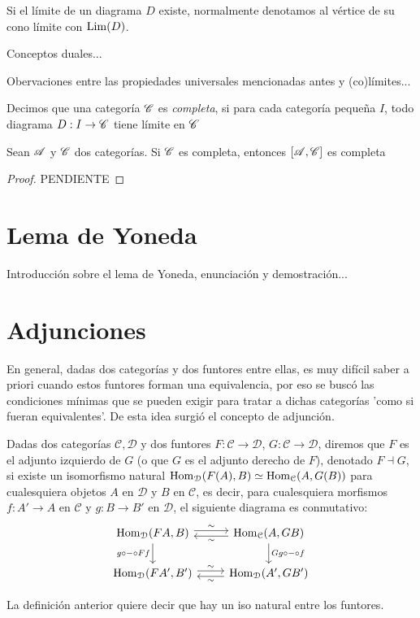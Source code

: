 \documentclass{comunicaciones}
\begin{document}
Si el límite de un diagrama $D$ existe, normalmente denotamos al vértice de su cono límite con $\mathrm{Lim}(D)$.

Conceptos duales...

Obervaciones entre las propiedades universales mencionadas antes y (co)límites...

\begin{dfn}
    Decimos que una categoría $\mathscr C$ es \emph{completa}, si para cada categoría pequeña $I$, todo diagrama $D:I\to\mathscr C$ tiene límite en $\mathscr C$
\end{dfn}


\begin{thm}
    Sean $\mathscr A$ y $\mathscr C$ dos categorías. Si $\mathscr C$ es completa, entonces $[\mathscr A,\mathscr C]$ es completa
\end{thm}
\begin{proof}
    PENDIENTE
\end{proof}

\section{Lema de Yoneda}

Introducción sobre el lema de Yoneda, enunciación y demostración...

\section{Adjunciones}

En general, dadas dos categorías y dos funtores entre ellas, es muy difícil saber a priori cuando estos funtores forman una equivalencia, por eso se buscó las condiciones mínimas que se pueden exigir para tratar a dichas categorías 'como si fueran equivalentes'. De esta idea surgió el concepto de adjunción.
\begin{dfn}
	Dadas dos categorías $\mathcal{C,D}$ y dos funtores $F:\mathcal{C\to D}$, $G:\mathcal{C\to D}$, diremos que $F$ es el adjunto izquierdo de $G$ (o que $G$ es el adjunto derecho de $F$), denotado $F\dashv G$, si existe un isomorfismo natural $\mathrm{Hom}_\mathcal{D}(F(A),B)\simeq \mathrm{Hom}_\mathcal{C}(A,G(B))$ para cualesquiera objetos $A$ en $\mathcal{D}$ y $B$ en $\mathcal{C}$, es decir, para cualesquiera morfismos $f:A'\to A$
	en $\mathcal C$ y $g:B\to B'$ en $\mathcal D$,
	el siguiente diagrama es conmutativo:
	\[
	\begin{tikzcd}
		\Hom_\mathcal{D}(FA,B)
		\ar[d,"g\circ-\circ Ff"']
		\ar[r,"\sim",shift left]
		& \Hom_\mathcal{C}(A,GB) 
		\ar[d,"Gg\circ-\circ f"]
		\ar[l,"\sim",shift left] \\
		\Hom_\mathcal{D}(FA',B')
		\ar[r,"\sim",shift left]
		& \Hom_\mathcal{D}(A',GB')
		\ar[l,"\sim",shift left]
	\end{tikzcd}
	\]
\end{dfn}
La definición anterior quiere decir que hay un iso natural entre los funtores.
\end{document}
